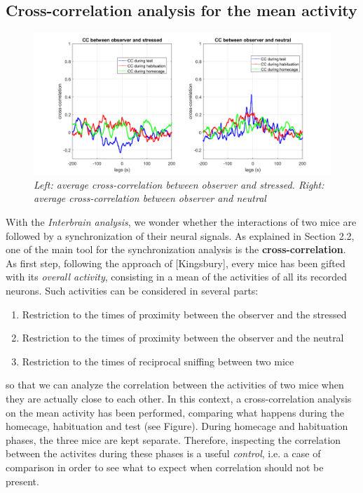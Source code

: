 \documentclass[a4paper]{article}
\begin{document}
\subsection{Cross-correlation analysis for the mean activity}

\begin{figure}[H]
	
	\begin{center}
		\hspace*{-1.4cm}
		\includegraphics[scale=.4]{average_cc.png} 
	\end{center} 
	\caption{\textit{Left: average cross-correlation between observer and stressed. Right: average cross-correlation between observer and neutral}}
	
\end{figure}

With the \textit{Interbrain analysis}, we wonder whether the interactions of two mice are followed by a synchronization of their neural signals. As explained in Section 2.2, one of the main tool for the synchronization analysis is the \textbf{cross-correlation}.\\
As first step, following the approach of [Kingsbury], every mice has been gifted with its \textit{overall activity}, consisting in a mean of the activities of all its recorded neurons. Such activities can be considered in several parts:

\begin{enumerate}
	\item Restriction to the times of proximity between the observer and the stressed
	\item Restriction to the times of proximity between the observer and the neutral
	\item Restriction to the times of reciprocal sniffing between two mice
\end{enumerate}

so that we can analyze the correlation between the activities of two mice when they are actually close to each other. In this context, a cross-correlation analysis on the mean activity has been performed, comparing what happens during the homecage, habituation and test (see Figure). During homecage and habituation phases, the three mice are kept separate. Therefore, inspecting the correlation between the activites during these phases is a useful \textit{control}, i.e. a case of comparison in order to see what to expect when correlation should not be present.
\\
\end{document}
